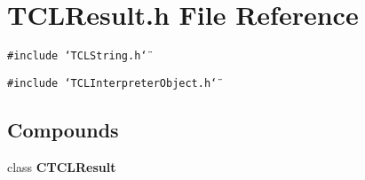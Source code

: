 \section{TCLResult.h File Reference}
\label{TCLResult_8h}
{\tt \#include \char`\"{}TCLString.h\char`\"{}}\par
{\tt \#include \char`\"{}TCLInterpreter\-Object.h\char`\"{}}\par
\subsection*{Compounds}
\begin{CompactItemize}
\item 
class {\bf CTCLResult}
\end{CompactItemize}
